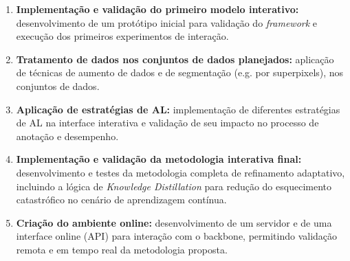 \begin{enumerate}
\item \textbf{Implementação e validação do primeiro modelo interativo:} desenvolvimento de um protótipo inicial para validação do \textit{framework} e execução dos primeiros experimentos de interação.


\item \textbf{Tratamento de dados nos conjuntos de dados planejados:} aplicação de técnicas de aumento de dados e de segmentação (e.g. por superpixels), nos conjuntos de dados.


\item \textbf{Aplicação de estratégias de \ac{AL}:} implementação de diferentes estratégias de \ac{AL} na interface interativa e validação de seu impacto no processo de anotação e desempenho.


\item \textbf{Implementação e validação da metodologia interativa final:} desenvolvimento e testes da metodologia completa de refinamento adaptativo, incluindo a lógica de \textit{Knowledge Distillation} para redução do esquecimento catastrófico no cenário de aprendizagem contínua.


\item \textbf{Criação do ambiente online:} desenvolvimento de um servidor e de uma interface online (\ac{API}) para interação com o backbone, permitindo validação remota e em tempo real da metodologia proposta.



\end{enumerate}
